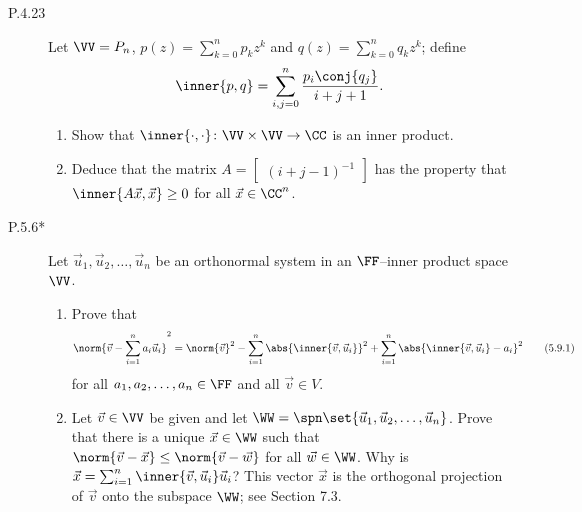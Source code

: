 \documentclass{homework}
\begin{document}
\begin{description}
\item[P.4.23]
  Let \(\VV = P_n\), \(p(z) = \sum_{k=0}^n p_k z^k\) and
  \(q(z) = \sum_{k=0}^n q_k z^k\); define
  \[
    \inner{p, q} = \sum_{i,j=0}^n \frac{p_i \conj{q_j}}{i+j+1}.
  \]
  \begin{enumerate}
  \item Show that
    \(\inner{\cdot, \cdot} \colon \VV \times \VV \to \CC\) is an inner
    product.

    \begin{solution}

    \end{solution}

  \item Deduce that the matrix
    \(A = \begin{bmatrix} (i+j-1)^{-1} \end{bmatrix}\) has the
    property that \(\inner{A \vec x, \vec x} \ge 0\) for all
    \(\vec x \in \CC^n\).

    \begin{solution}

    \end{solution}
  \end{enumerate}


\item[P.5.6*]
  Let \(\vec u_1, \vec u_2, \dots, \vec u_n\) be an orthonormal system
  in an \(\FF\)--inner product space \(\VV\).
  \begin{enumerate}
  \item Prove that
    \[
      \norm{\vec v - \sum_{i=1}^n a_i \vec u_i}^2 =
      \norm{\vec v}^2 -
      \sum_{i=1}^n \abs{\inner{\vec v, \vec u_i}}^2 +
      \sum_{i=1}^n \abs{\inner{\vec v, \vec u_i} - a_i}^2
      \tag{5.9.1}
    \]
    for all \(a_1, a_2, \dots, a_n \in \FF\) and all \(\vec v \in V\).

    \begin{solution}

    \end{solution}

  \item Let \(\vec v \in \VV\) be given and let
    \(\WW = \spn\set{\vec u_1, \vec u_2, \dots, \vec u_n}\).  Prove
    that there is a unique \(\vec x \in \WW\) such that
    \(\norm{\vec v - \vec x} \le \norm{\vec v - \vec w}\) for all
    \(\vec w \in \WW\).  Why is
    \(\vec x = \sum_{i=1}^n \inner{\vec v, \vec u_i} \vec u_i\)?  This
    vector \(\vec x\) is the orthogonal projection of \(\vec v\) onto
    the subspace \(\WW\); see Section 7.3.


\end{enumerate}
\end{description}
\end{document}
